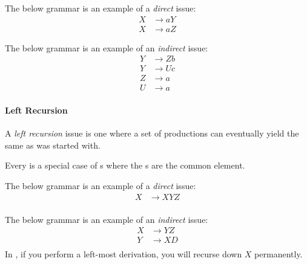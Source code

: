 The below grammar is an example of a \emph{direct}  issue:
\begin{equation}\label{eq:Direct_Common_Prefix}
  \begin{aligned}
    X &\rightarrow aY \\
    X &\rightarrow aZ
  \end{aligned}
\end{equation}

The below grammar is an example of an \emph{indirect}  issue:
\begin{equation}\label{eq:Indirect_Common_Prefix}
  \begin{aligned}
    Y &\rightarrow Zb \\
    Y &\rightarrow Uc \\
    Z &\rightarrow a \\
    U &\rightarrow a
  \end{aligned}
\end{equation}

\paragraph{Left Recursion}\label{par:LLParsing_Issues_Left_Recursion}
\begin{definition}\label{def:Left_Recursion}
  A \emph{left recursion} issue is one where a set of productions can eventually yield the same  as was started with.

  \begin{remark}
    Every  is a special case of s where the s are the common element.
  \end{remark}
\end{definition}

The below grammar is an example of a \emph{direct}  issue:
\begin{equation}\label{eq:Direct_Left_Recursion}
  \begin{aligned}
    X &\rightarrow XYZ \\
  \end{aligned}
\end{equation}

The below grammar is an example of an \emph{indirect}  issue:
\begin{equation}\label{eq:Indirect_Left_Recursion}
  \begin{aligned}
    X &\rightarrow YZ \\
    Y &\rightarrow XD \\
  \end{aligned}
\end{equation}
In , if you perform a left-most derivation, you will recurse down $X$ permanently.

